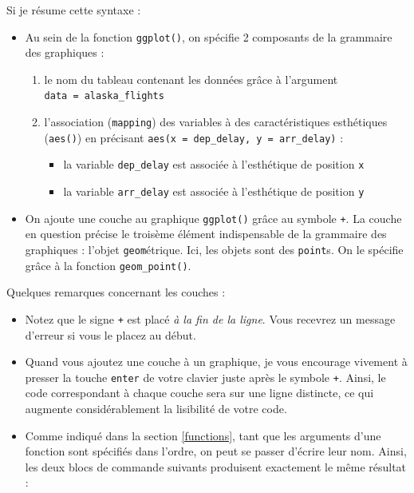 \documentclass[
  a4paper,
]{article}
\providecommand{\tightlist}{%
  \setlength{\itemsep}{0pt}\setlength{\parskip}{0pt}}
\begin{document}
Si je résume cette syntaxe :

\begin{itemize}
\tightlist
\item
  Au sein de la fonction \texttt{ggplot()}, on spécifie 2 composants de la grammaire des graphiques :

  \begin{enumerate}
  \def\labelenumi{\arabic{enumi}.}
  \tightlist
  \item
    le nom du tableau contenant les données grâce à l'argument \texttt{data\ =\ alaska\_flights}
  \item
    l'association (\texttt{mapping}) des variables à des caractéristiques esthétiques (\texttt{aes()}) en précisant \texttt{aes(x\ =\ dep\_delay,\ y\ =\ arr\_delay)} :

    \begin{itemize}
    \tightlist
    \item
      la variable \texttt{dep\_delay} est associée à l'esthétique de position \texttt{x}
    \item
      la variable \texttt{arr\_delay} est associée à l'esthétique de position \texttt{y}
    \end{itemize}
  \end{enumerate}
\item
  On ajoute une couche au graphique \texttt{ggplot()} grâce au symbole \texttt{+}. La couche en question précise le troisème élément indispensable de la grammaire des graphiques : l'objet \texttt{geom}étrique. Ici, les objets sont des \texttt{point}s. On le spécifie grâce à la fonction \texttt{geom\_point()}.
\end{itemize}

Quelques remarques concernant les couches :

\begin{itemize}
\tightlist
\item
  Notez que le signe \texttt{+} est placé \emph{à la fin de la ligne}. Vous recevrez un message d'erreur si vous le placez au début.
\item
  Quand vous ajoutez une couche à un graphique, je vous encourage vivement à presser la touche \texttt{enter} de votre clavier juste après le symbole \texttt{+}. Ainsi, le code correspondant à chaque couche sera sur une ligne distincte, ce qui augmente considérablement la lisibilité de votre code.
\item
  Comme indiqué dans la section \ref{functions}, tant que les arguments d'une fonction sont spécifiés dans l'ordre, on peut se passer d'écrire leur nom. Ainsi, les deux blocs de commande suivants produisent exactement le même résultat :
\end{itemize}
\end{document}
